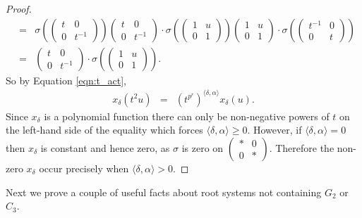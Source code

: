 \begin{proof}
\begin{eqnarray*}
&=&
\sigma\left(
\left(\begin{matrix}
t & 0 \\ 0 & t^{-1}
\end{matrix}\right)
\right)
\left(\begin{matrix}
t & 0 \\ 0 & t^{-1}
\end{matrix}\right) \cdot
\sigma\left(
\left(\begin{matrix}
1 & u \\ 0 & 1
\end{matrix}\right)
\right)
\left(\begin{matrix}
1 & u \\ 0 & 1
\end{matrix}\right) \cdot
\sigma\left(
\left(\begin{matrix}
t^{-1} & 0 \\ 0 & t
\end{matrix}\right)
\right)\\
&=&
\left(\begin{matrix}
t & 0 \\ 0 & t^{-1}
\end{matrix}\right) \cdot
\sigma\left(
\left(\begin{matrix}
1 & u \\ 0 & 1
\end{matrix}\right)
\right).
\end{eqnarray*}
So by Equation \ref{eqn:t_act},
\begin{eqnarray*}
x_\delta\left(t^2u\right) &=& (t^{p^r})^{\langle \delta, \alpha\rangle}x_\delta\left(u\right).
\end{eqnarray*}
Since $x_\delta$ is a polynomial function there can only be non-negative powers of $t$ on the left-hand side of the equality which forces $\langle \delta, \alpha \rangle \geq 0$. However, if $\langle \delta, \alpha \rangle = 0$ then $x_\delta$ is constant and hence zero, as $\sigma$ is zero on $\left(\begin{matrix} * & 0 \\ 0 & *\end{matrix}\right)$. Therefore the non-zero $x_\delta$ occur precisely when $\langle \delta, \alpha \rangle > 0$.
\end{proof}

Next we prove a couple of useful facts about root systems not containing $G_2$ or $C_3$.

